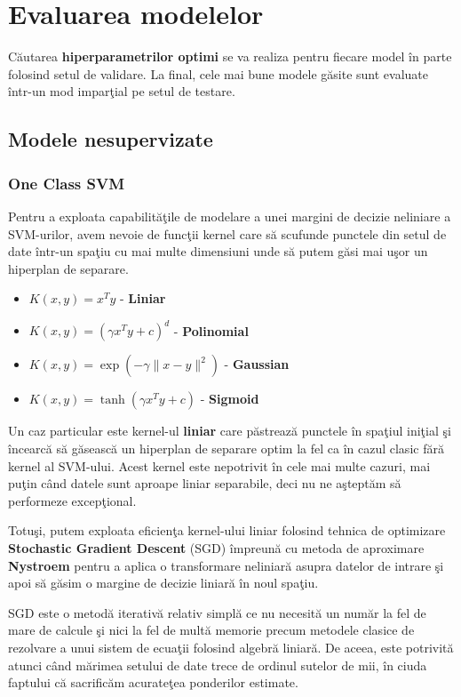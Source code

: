 \chapter{Evaluarea modelelor}


Căutarea \textbf{hiperparametrilor optimi} se va realiza pentru fiecare model 
în parte folosind setul de validare. La final, cele mai bune modele 
găsite sunt evaluate într-un mod imparţial pe setul de testare. 

\section{Modele nesupervizate}

\subsection{One Class SVM}

Pentru a exploata capabilităţile de modelare a unei margini de decizie 
neliniare a SVM-urilor, avem nevoie de funcţii kernel care să scufunde
punctele din setul de date într-un spaţiu cu mai multe dimensiuni unde 
să putem găsi mai uşor un hiperplan de separare.

\begin{itemize}
    \item \(K(x, y) = x^T y\) - \textbf{Liniar}
    \item \(K(x, y) = (\gamma x^T y + c)^d\) - \textbf{Polinomial}
    \item \(K(x, y) = \exp\left(-\gamma{\|x - y\|^2}\right)\) - \textbf{Gaussian}
    \item \(K(x, y) = \tanh(\gamma x^T y + c)\) - \textbf{Sigmoid}
\end{itemize}

Un caz particular este kernel-ul \textbf{liniar} care păstrează punctele
în spaţiul iniţial şi încearcă să găsească un hiperplan de separare 
optim la fel ca în cazul clasic fără kernel al SVM-ului.
Acest kernel este nepotrivit în cele mai multe cazuri, mai puţin când 
datele sunt aproape liniar separabile, deci nu ne aşteptăm să performeze
excepţional.

Totuşi, putem exploata eficienţa kernel-ului liniar folosind tehnica de 
optimizare \textbf{Stochastic Gradient Descent} (SGD) împreună cu metoda de aproximare 
\textbf{Nystroem} pentru a aplica o transformare neliniară asupra
datelor de intrare şi apoi să găsim o margine de decizie liniară în noul spaţiu.

SGD este o metodă iterativă relativ simplă ce nu necesită un număr la fel de 
mare de calcule şi nici la fel de multă memorie precum metodele clasice 
de rezolvare a unui sistem de ecuaţii folosind algebră liniară. De aceea, este
potrivită atunci când mărimea setului de date trece de ordinul sutelor de mii,
în ciuda faptului că sacrificăm acurateţea ponderilor estimate.


